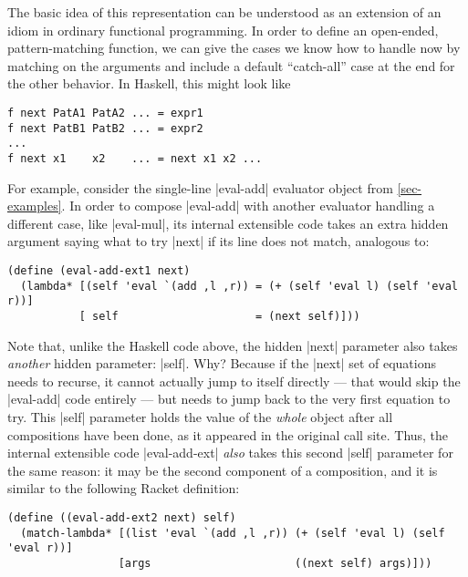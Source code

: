 The basic idea of this representation can be understood as an extension of an idiom in ordinary functional programming.
In order to define an open-ended, pattern-matching function, we can give the cases we know how to handle now by matching on the arguments and include a default ``catch-all'' case at the end for the other behavior.
In Haskell, this might look like
\begin{verbatim}
f next PatA1 PatA2 ... = expr1
f next PatB1 PatB2 ... = expr2
...
f next x1    x2    ... = next x1 x2 ...
\end{verbatim}

For example, consider the single-line \scm|eval-add| evaluator object from \cref{sec-examples}.
In order to compose \scm|eval-add| with another evaluator handling a different case, like \scm|eval-mul|, its internal extensible code takes an extra hidden argument saying what to try \scm|next| if its line does not match, analogous to:
\begin{verbatim}
(define (eval-add-ext1 next)
  (lambda* [(self 'eval `(add ,l ,r)) = (+ (self 'eval l) (self 'eval r))]
           [ self                     = (next self)]))
\end{verbatim}
Note that, unlike the Haskell code above, the hidden \scm|next| parameter also takes \emph{another} hidden parameter: \scm|self|.
Why?
Because if the \scm|next| set of equations needs to recurse, it cannot actually jump to itself directly --- that would skip the \scm|eval-add| code entirely --- but needs to jump back to the very first equation to try.
This \scm|self| parameter holds the value of the \emph{whole} object after all compositions have been done, as it appeared in the original call site.
Thus, the internal extensible code \scm|eval-add-ext| \emph{also} takes this second \scm|self| parameter for the same reason: it may be the second component of a composition, and it is similar to the following Racket definition:
\begin{verbatim}
(define ((eval-add-ext2 next) self)
  (match-lambda* [(list 'eval `(add ,l ,r)) (+ (self 'eval l) (self 'eval r))]
                 [args                      ((next self) args)]))
\end{verbatim}

